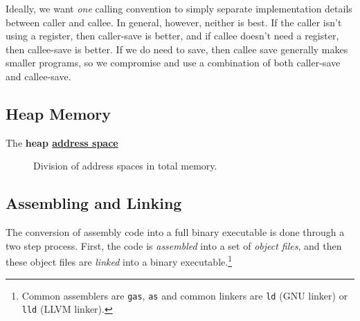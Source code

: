   Ideally, we want \textit{one} calling convention to simply separate implementation details between caller and callee. In general, however, neither is best. If the caller isn't using a register, then caller-save is better, and if callee doesn't need a register, then callee-save is better. If we do need to save, then callee save generally makes smaller programs, so we compromise and use a combination of both caller-save and callee-save. 

\subsection{Heap Memory}

  \begin{definition}
    \label{def:heap-memory}
    The \textbf{heap \hyperref[def:address-space]{address space}} 
  \end{definition}

  \begin{figure}[H]
    \centering 
    \caption{Division of address spaces in total memory.} 
  \end{figure}

\subsection{Assembling and Linking}

  The conversion of assembly code into a full binary executable is done through a two step process. First, the code is \textit{assembled} into a set of \textit{object files}, and then these object files are \textit{linked} into a binary executable.\footnote{Common assemblers are \texttt{gas}, \texttt{as} and common linkers are \texttt{ld} (GNU linker) or \texttt{lld} (LLVM linker).}

